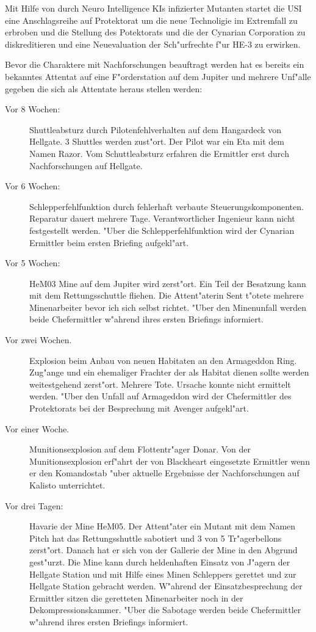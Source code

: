 Mit Hilfe von durch Neuro Intelligence KIs infizierter Mutanten startet die USI eine Anschlagsreihe auf Protektorat um die neue Technoligie im Extremfall zu erbroben und die Stellung des Potektorats und die der Cynarian Corporation zu diskreditieren und eine Neuevaluation der Sch"urfrechte f"ur HE-3 zu erwirken.

Bevor die Charaktere mit Nachforschungen beauftragt werden hat es bereits ein bekanntes Attentat auf eine F"orderstation auf dem Jupiter und mehrere Unf"alle gegeben die sich als Attentate heraus stellen werden:

\begin{description}
\item [Vor 8 Wochen:] Shuttleabsturz durch Pilotenfehlverhalten auf dem Hangardeck von Hellgate. 3 Shuttles
      werden zust"ort. Der Pilot war ein Eta mit dem Namen Razor. Vom Schuttleabsturz erfahren die Ermittler erst durch Nachforschungen auf Hellgate.
\item [Vor 6 Wochen:] Schlepperfehlfunktion durch fehlerhaft verbaute Steuerungskomponenten. Reparatur dauert
      mehrere Tage. Verantwortlicher Ingenieur kann nicht festgestellt werden. "Uber die Schlepperfehlfunktion wird der Cynarian Ermittler beim ersten Briefing aufgekl"art.
\item [Vor 5 Wochen:] HeM03 Mine auf dem Jupiter wird zerst"ort. Ein Teil der Besatzung kann mit dem
      Rettungsschuttle fliehen. Die Attent"aterin Sent t"otete mehrere Minenarbeiter bevor ich sich selbst richtet. "Uber den Minenunfall werden beide Chefermittler w"ahrend ihres ersten Briefings informiert.
\item [Vor zwei Wochen.] Explosion beim Anbau von neuen Habitaten an den Armageddon Ring. Zug"ange und ein
      ehemaliger Frachter der als Habitat dienen sollte werden weitestgehend zerst"ort.  Mehrere Tote. Ursache konnte nicht ermittelt werden. "Uber den Unfall auf Armageddon wird der Chefermittler des Protektorats bei der Besprechung mit Avenger aufgekl"art.
\item [Vor einer Woche.] Munitionsexplosion auf dem Flottentr"ager Donar. Von der Munitionsexplosion erf"ahrt der
      von Blackheart eingesetzte Ermittler wenn er den Komandostab "uber aktuelle Ergebnisse der Nachforschungen auf Kalisto unterrichtet.
\item [Vor drei Tagen:] Havarie der Mine HeM05. Der Attent"ater ein Mutant mit dem Namen Pitch hat das
      Rettungsshuttle sabotiert und 3 von 5 Tr"agerbellons zerst"ort. Danach hat er sich von der Gallerie der Mine in den Abgrund gest"urzt. Die Mine kann durch heldenhaften Einsatz von J"agern der Hellgate Station und mit Hilfe eines Minen Schleppers gerettet und zur Hellgate Station gebracht werden. W"ahrend der Einsatzbesprechung der Ermittler sitzen die geretteten Minenarbeiter noch in der Dekompressionskammer. "Uber die Sabotage werden beide Chefermittler w"ahrend ihres ersten Briefings informiert.
\end{description}

